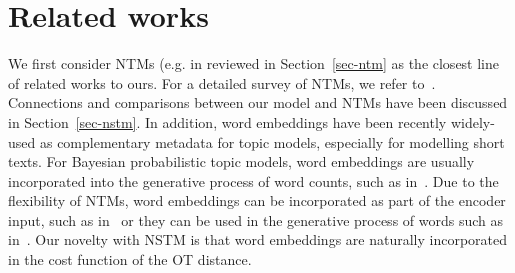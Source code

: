 \documentclass{article}
\begin{document}
\section{Related works}


We first consider NTMs (e.g. in \cite{miao2016neural,srivastava2017autoencoding,krishnan2018challenges,card2018neural,burkhardt2019decoupling, dieng2019topic} reviewed in Section~\ref{sec-ntm} as the closest line of related works to ours.
For a detailed survey of NTMs, we refer to~\cite{zhao2021topic}. Connections and comparisons between our model and NTMs have been discussed in Section~\ref{sec-nstm}.
In addition, word embeddings have been recently widely-used as complementary metadata for topic models, especially for modelling short texts. For Bayesian probabilistic topic models, word embeddings are usually incorporated into the generative process of word counts, such as in~\cite{petterson2010word,nguyen2015improving,li2016topic,zhao2017word}.
Due to the flexibility of NTMs, word embeddings can be incorporated as part of the encoder input, such as in~\citet{card2018neural} or they can be used in the generative process of words such as in~\citet{dieng2019topic}.
Our novelty with NSTM is that word embeddings are naturally incorporated in the cost function of the OT distance.
\end{document}
